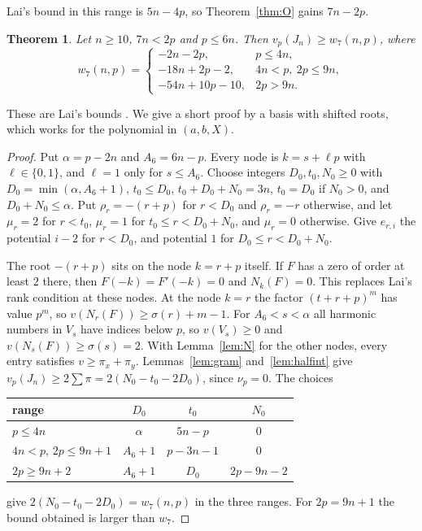 \documentclass[11pt]{amsart}
\newtheorem{theorem}{Theorem}[section]
\theoremstyle{definition}
\theoremstyle{remark}
\numberwithin{equation}{section}
\begin{document}
Lai's bound in this range is $5n-4p$, so Theorem~\ref{thm:O} gains $7n-2p$.

\begin{theorem}\label{thm:B7}
Let $n\ge10$, $7n<2p$ and $p\le6n$. Then $v_p(J_n)\ge w_7(n,p)$, where
\[
 w_7(n,p)=\begin{cases}-2n-2p,&p\le4n,\\-18n+2p-2,&4n<p,\ 2p\le9n,\\-54n+10p-10,&2p>9n.\end{cases}
\]
\end{theorem}

These are Lai's bounds \cite[Lemma~5.4]{Lai2026}. We give a short proof by a basis with shifted roots, which works
for the polynomial in $(a,b,X)$.

\begin{proof}
Put $\alpha=p-2n$ and $A_6=6n-p$. Every node is $k=s+\ell p$ with $\ell\in\{0,1\}$, and $\ell=1$ only for $s\le A_6$.
Choose integers $D_0,t_0,N_0\ge0$ with $D_0=\min(\alpha,A_6+1)$, $t_0\le D_0$, $t_0+D_0+N_0=3n$, $t_0=D_0$ if $N_0>0$,
and $D_0+N_0\le\alpha$. Put $\rho_r=-(r+p)$ for $r<D_0$ and $\rho_r=-r$ otherwise, and let $\mu_r=2$ for $r<t_0$,
$\mu_r=1$ for $t_0\le r<D_0+N_0$, and $\mu_r=0$ otherwise. Give $e_{r,i}$ the potential $i-2$ for $r<D_0$, and
potential $1$ for $D_0\le r<D_0+N_0$.

The root $-(r+p)$ sits on the node $k=r+p$ itself. If $F$ has a zero of order at least $2$ there, then
$F(-k)=F'(-k)=0$ and $N_k(F)=0$. This replaces Lai's rank condition at these nodes. At the node $k=r$ the factor
$(t+r+p)^m$ has value $p^m$, so $v(N_r(F))\ge\sigma(r)+m-1$. For $A_6<s<\alpha$ all harmonic numbers in $V_s$ have
indices below $p$, so $v(V_s)\ge0$ and $v(N_s(F))\ge\sigma(s)=2$. With Lemma~\ref{lem:N} for the other nodes, every
entry satisfies $v\ge\pi_x+\pi_y$. Lemmas~\ref{lem:gram} and~\ref{lem:halfint} give
$v_p(J_n)\ge2\sum\pi=2(N_0-t_0-2D_0)$, since $\nu_p=0$. The choices
\begin{center}
\renewcommand{\arraystretch}{1.15}
\begin{tabular}{@{}lccc@{}}
\toprule
range & $D_0$ & $t_0$ & $N_0$\\
\midrule
$p\le4n$ & $\alpha$ & $5n-p$ & $0$\\
$4n<p$, $2p\le9n+1$ & $A_6+1$ & $p-3n-1$ & $0$\\
$2p\ge9n+2$ & $A_6+1$ & $D_0$ & $2p-9n-2$\\
\bottomrule
\end{tabular}
\end{center}
give $2(N_0-t_0-2D_0)=w_7(n,p)$ in the three ranges. For $2p=9n+1$ the bound obtained is larger than $w_7$.
\end{proof}
\end{document}
